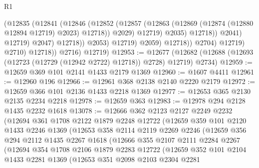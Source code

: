\begin{lexlean}{R1}
\begin{coremodule}
                                      (@12835
                                        (@12841
                                          (@12846
                                            (@12852
                                              (@12857
                                                (@12863
                                                  (@12869
                                                    (@12874 (@12880 @12894 @12719) @2023)
                                                    @12718))
                                                @2029)
                                              @12719)
                                            @2035)
                                          @12718))
                                      @2041)
                                    @12719)
                                  @2047)
                                @12718))
                            @2053)
                          @12719)
                        @2059)
                      @12718))
                  @2704)
                @12719)
              @2710)
            @12718))
        @2716)
      @12719)
@12953 := @12677
    (@12682 (@12688 (@12693 (@12723 (@12729 (@12942 @2722) @12718)) @2728) @12719) @2734)
@12959 := @12659 @369 @101 @2141 @1433 @2179 @1369
@12960 := @1607 @4411
@12961 := @12960 @196
@12966 := @12961 @368 @2138 @2140 @2220 @2179
@12972 := @12659 @366 @101 @2136 @1433 @2218 @1369
@12977 := @12653 @365 @2130 @2135 @2234 @2218
@12978 := @12659 @363
@12983 := @12978 @294 @2128 @1435 @2232 @1618
@13078 := @12666
    @362
    @2123
    @2127
    @2249
    @2232
    (@12694
      @361
      @1708
      @2122
      @1879
      @2248
      @12722
      (@12659
        @359
        @101
        @2120
        @1433
        @2246
        @1369
        (@12653
          @358
          @2114
          @2119
          @2269
          @2246
          (@12659
            @356
            @294
            @2112
            @1435
            @2267
            @1618
            (@12666
              @355
              @2107
              @2111
              @2284
              @2267
              (@12694
                @354
                @1708
                @2106
                @1879
                @2283
                @12722
                (@12659
                  @352
                  @101
                  @2104
                  @1433
                  @2281
                  @1369
                  (@12653
                    @351
                    @2098
                    @2103
                    @2304
                    @2281

\end{coremodule}
\end{lexlean}
